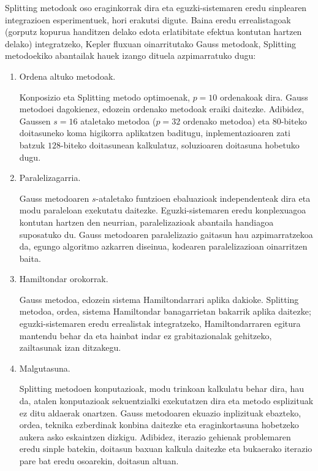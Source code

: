 Splitting metodoak oso eraginkorrak dira eta eguzki-sistemaren eredu sinplearen integrazioen  esperimentuek, hori erakutsi digute. Baina eredu errealistagoak (gorputz kopurua handitzen delako edota erlatibitate efektua kontutan hartzen delako) integratzeko, Kepler fluxuan oinarritutako Gauss metodoak, Splitting metodoekiko abantailak hauek izango dituela azpimarratuko dugu:  

\begin{enumerate}

\item Ordena altuko metodoak.

Konposizio eta  Splitting metodo optimoenak, $p=10$ ordenakoak dira. Gauss metodoei dagokienez, edozein ordenako metodoak eraiki daitezke. Adibidez, Gaussen $s=16$ ataletako metodoa ($p=32$ ordenako metodoa) eta $80$-biteko doitasuneko koma higikorra aplikatzen baditugu, inplementazioaren zati batzuk $128$-biteko doitasunean kalkulatuz, soluzioaren doitasuna hobetuko dugu.  

\item Paralelizagarria.

Gauss metodoaren $s$-ataletako funtzioen ebaluazioak independenteak dira eta modu paraleloan exekutatu daitezke. Eguzki-sistemaren eredu konplexuagoa kontutan hartzen den neurrian, paralelizazioak abantaila handiagoa suposatuko du. Gauss metodoaren paralelizazio gaitasun hau azpimarratzekoa da, egungo algoritmo azkarren diseinua, kodearen paralelizazioan oinarritzen baita.

\item Hamiltondar orokorrak.

Gauss metodoa, edozein sistema Hamiltondarrari aplika dakioke. Splitting metodoa, ordea, sistema Hamiltondar banagarrietan bakarrik aplika daitezke; eguzki-sistemaren eredu errealistak integratzeko, Hamiltondarraren egitura mantendu behar da eta hainbat indar ez grabitazionalak  gehitzeko, zailtasunak izan ditzakegu. 

\item Malgutasuna.

Splitting metodoen konputazioak, modu trinkoan kalkulatu behar dira, hau da, atalen konputazioak sekuentzialki exekutatzen dira eta metodo esplizituak ez ditu aldaerak onartzen. Gauss metodoaren ekuazio inplizituak ebazteko, ordea, teknika ezberdinak konbina daitezke eta eraginkortasuna hobetzeko aukera asko eskaintzen dizkigu. Adibidez, iterazio gehienak problemaren eredu sinple batekin, doitasun baxuan kalkula daitezke  \cite{Beylkin2014} eta bukaerako iterazio pare bat eredu osoarekin, doitasun altuan. 


\end{enumerate}
